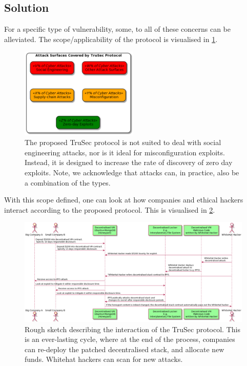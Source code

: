 \subsection{Solution}
For a specific type of vulnerability, some, to all of these concerns can be alleviated. The scope/applicability of the protocol is visualised in \cref{fig:protocol_scope}.
\begin{figure}[H]
    \centering
    \includegraphics[width=0.50\textwidth]{images/plantuml/scope.png}
    \caption{The proposed TruSec protocol is not suited to deal with social engineering attacks, nor is it ideal for misconfiguration exploits. Instead, it is designed to increase the rate of discovery of zero day exploits. Note, we acknowledge that attacks can, in practice, also be a combination of the types.}
    \label{fig:protocol_scope}
\end{figure}

With this scope defined, one can look at how companies and ethical hackers interact according to the proposed protocol. This is visualised in \cref{fig:interaction}.

\begin{figure}[H]
    \centering
    \includegraphics[width=1.0\textwidth]{images/plantuml/interaction.png}
    \caption{Rough sketch describing the interaction of the TruSec protocol. This is an ever-lasting cycle, where at the end of the process, companies can re-deploy the patched decentralised stack, and allocate new funds. Whitehat hackers can scan for new attacks.}
    \label{fig:interaction}
\end{figure}

